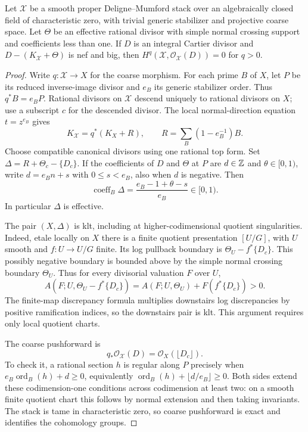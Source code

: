 \begin{lemma}\label{lem:C-orbifold-vanishing}
Let $\mathcal X$ be a smooth proper Deligne--Mumford stack over an
algebraically closed field of characteristic zero, with trivial generic
stabilizer and projective coarse space.  Let $\Theta$ be an effective
rational divisor with simple normal crossing support and coefficients
less than one.  If $D$ is an integral Cartier divisor and
$D-(K_{\mathcal X}+\Theta)$ is nef and big, then
$H^q(\mathcal X,\mathcal O_{\mathcal X}(D))=0$ for $q>0$.
\end{lemma}
\begin{proof}
Write $q:\mathcal X\to X$ for the coarse morphism.  For each prime $B$
of $X$, let $P$ be its reduced inverse-image divisor and $e_B$ its
generic stabilizer order.  Thus $q^*B=e_BP$.  Rational divisors on
$\mathcal X$ descend uniquely to rational divisors on $X$; use a
subscript $c$ for the descended divisor.  The local normal-direction
equation $t=z^{e_B}$ gives
\[
 K_{\mathcal X}=q^*(K_X+R),\qquad
 R=\sum_B(1-e_B^{-1})B.
\]
Choose compatible canonical divisors using one rational top form.
Set $\Delta=R+\Theta_c-\{D_c\}$.  If the coefficients of $D$ and
$\Theta$ at $P$ are $d\in\mathbb Z$ and $\theta\in[0,1)$, write
$d=e_Bn+s$ with $0\le s<e_B$, also when $d$ is negative.  Then
\[
 \operatorname{coeff}_B\Delta
    =\frac{e_B-1+\theta-s}{e_B}\in[0,1).
\]
In particular $\Delta$ is effective.

The pair $(X,\Delta)$ is klt, including at higher-codimensional quotient
singularities.  Indeed, etale locally on $X$ there is a finite quotient
presentation $[U/G]$, with $U$ smooth and $f:U\to U/G$ finite.  Its
log pullback boundary is
$\Theta_U-f^*\{D_c\}$.  This possibly negative boundary is bounded
above by the simple normal crossing boundary $\Theta_U$.  Thus for
every divisorial valuation $F$ over $U$,
\[
 A(F;U,\Theta_U-f^*\{D_c\})
   =A(F;U,\Theta_U)+F(f^*\{D_c\})>0.
\]
The finite-map discrepancy formula multiplies downstairs log
discrepancies by positive ramification indices, so the downstairs
pair is klt.  This argument requires only local quotient charts.

The coarse pushforward is
\[
 q_*\mathcal O_{\mathcal X}(D)=\mathcal O_X(\lfloor D_c\rfloor).
\]
To check it, a rational section $h$ is regular along $P$ precisely when
$e_B\operatorname{ord}_B(h)+d\ge0$, equivalently
$\operatorname{ord}_B(h)+\lfloor d/e_B\rfloor\ge0$.  Both sides
extend these codimension-one conditions across codimension at least two:
on a smooth finite quotient chart this follows by normal extension and
then taking invariants.  The stack is tame in characteristic zero, so
coarse pushforward is exact and identifies the cohomology groups.


\end{proof}

